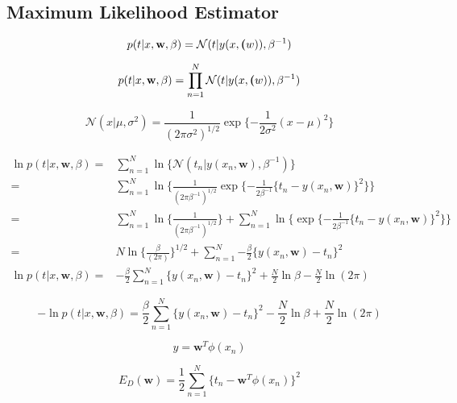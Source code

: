 \documentclass[12pt,twoside,a4paper]{article}
\begin{document}
\subsection{Maximum Likelihood Estimator}

\begin{equation}\label{1.60}
    p(t|x,\textbf{w}, \beta) = \mathcal{N}(t|y(x,\textbf(w)),\beta^{-1})
\end{equation}

\begin{equation}\label{1.61}
    p(t|x,\textbf{w}, \beta) = \prod_{n=1}^{N}\mathcal{N}(t|y(x,\textbf(w)),\beta^{-1})
\end{equation}

\begin{equation} \label{1.46}
    \mathcal{N}(x|\mu,\sigma^2) = \frac{1}{(2\pi\sigma^2)^{1/2}}\exp\{-\frac{1}{2\sigma^2}(x-\mu)^2\}
\end{equation}

\begin{align} \label{1.62}
\ln p(t|x,\textbf{w}, \beta) =& \sum_{n=1}^{N} \ln \{ \mathcal{N}(t_n|y(x_n,\textbf{w}),\beta^{-1}) \} \\
=& \sum_{n=1}^{N} \ln \{ \frac{1}{(2\pi\beta^{-1})^{1/2}}\exp\{-\frac{1}{2\beta^{-1}}\{t_n-y(x_n,\textbf{w})\}^2\}\} \\
=&\sum_{n=1}^{N} \ln \{ \frac{1}{(2\pi\beta^{-1})^{1/2}} \} + \sum_{n=1}^{N} \ln \{\exp\{-\frac{1}{2\beta^{-1}}\{t_n-y(x_n,\textbf{w})\}^2\}\} \\
=& N\ln \{ \frac{\beta}{(2\pi)} \}^{1/2} + \sum_{n=1}^{N} {-\frac{\beta}{2}\{y(x_n,\textbf{w})-t_n\}^2} \\
\ln p(t|x,\textbf{w}, \beta) =& -\frac{\beta}{2}\sum_{n=1}^{N} {\{y(x_n,\textbf{w})-t_n\}^2} + \frac{N}{2}\ln\beta - \frac{N}{2}\ln(2\pi)
\end{align}

\begin{equation} \label{NLL}
    -\ln p(t|x,\textbf{w}, \beta) = \frac{\beta}{2}\sum_{n=1}^{N} {\{y(x_n,\textbf{w})-t_n\}^2} - \frac{N}{2}\ln\beta + \frac{N}{2}\ln(2\pi)
\end{equation}

\begin{equation} \label{MLPRED}
    y = \textbf{w}^T\phi(x_n)
\end{equation}

\begin{equation}\label{ERRML2}
    E_D(\textbf{w}) = \frac{1}{2}\sum_{n=1}^{N}\{t_n - \textbf{w}^T\phi(x_n)\}^2
\end{equation}
\end{document}
